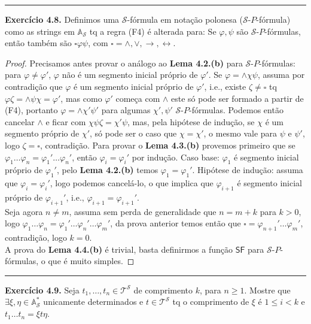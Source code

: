 \documentclass[11pt]{article}
\newcommand{\mc}[1]{\mathcal{#1}}
\newcommand{\msf}[1]{\mathsf{#1}}
\newcommand{\mbb}[1]{\mathbb{#1}}
\begin{document}
\hrule

\begin{shaded}
\textbf{Exercício 4.8.} Definimos uma $\mc{S}$-fórmula em notação polonesa ($\mc{S}$-$P$-fórmula) como as strings em $\mbb{A}_{\mc{S}}$ tq a regra (F4) é alterada para: Se $\varphi,\psi$ são $\mc{S}$-$P$-fórmulas, então também são $\square\varphi\psi$, com $\square=\wedge,\vee,\to,\leftrightarrow$.
\end{shaded}

\begin{proof}
    Precisamos antes provar o análogo ao \textbf{Lema 4.2.(b)} para $\mc{S}$-$P$-fórmulas: para $\varphi\ne\varphi'$, $\varphi$ não é um segmento inicial próprio de $\varphi'$. Se $\varphi=\wedge\chi\psi$, assuma por contradição que $\varphi$ é um segmento inicial próprio de $\varphi'$, i.e., existe $\zeta\ne\square$ tq $\varphi\zeta=\wedge\psi\chi=\varphi'$, mas como $\varphi'$ começa com $\wedge$ este só pode ser formado a partir de (F4), portanto $\varphi=\wedge\chi'\psi'$ para algumas $\chi',\psi'$ $\mc{S}$-$P$-fórmulas. Podemos então cancelar $\wedge$ e ficar com $\chi\psi\zeta=\chi'\psi$, mas, pela hipótese de indução, se $\chi$ é um segmento próprio de $\chi'$, só pode ser o caso que $\chi=\chi'$, o mesmo vale para $\psi$ e $\psi'$, logo $\zeta=\square$, contradição.
    Para provar o \textbf{Lema 4.3.(b)} provemos primeiro que se $\varphi_1\dots\varphi_n=\varphi_1'\dots\varphi_n'$, então $\varphi_i=\varphi_i'$ por indução. Caso base: $\varphi_1$ é segmento inicial próprio de $\varphi_1'$, pelo \textbf{Lema 4.2.(b)} temos $\varphi_1=\varphi_1'$. Hipótese de indução: assuma que $\varphi_i=\varphi_i'$, logo podemos cancelá-lo, o que implica que $\varphi_{i+1}$ é segmento inicial próprio de $\varphi_{i+1}'$, i.e., $\varphi_{i+1}=\varphi_{i+1}'$.\\
    Seja agora $n\ne m$, assuma sem perda de generalidade que $n = m + k$ para $k > 0$, logo $\varphi_1\dots\varphi_n=\varphi_1'\dots\varphi_n'\dots\varphi_m'$, da prova anterior temos então que $\square=\varphi_{n+1}'\dots\varphi_m'$, contradição, logo $k = 0$.\\
    A prova do \textbf{Lema 4.4.(b)} é trivial, basta definirmos a função $\msf{SF}$ para $\mc{S}$-$P$-fórmulas, o que é muito simples.
\end{proof}

\hrule

\begin{shaded}
\textbf{Exercício 4.9.} Seja $t_1,\dots,t_n\in\mc{T}^\mc{S}$ de comprimento $k$, para $n\ge1$. Mostre que $\exists\xi,\eta\in\mbb{A}^*_\mc{S}$ unicamente determinados e $t\in\mc{T}^\mc{S}$ tq o comprimento de $\xi$ é $1\le i<k$ e $t_1\dots t_n = \xi t\eta$.
\end{shaded}
\end{document}
